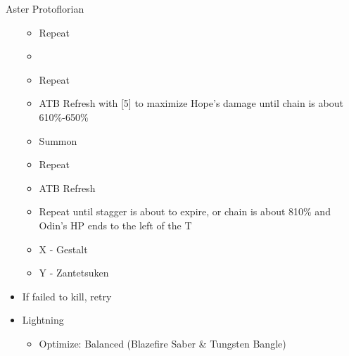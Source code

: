 \begin{paracol}{2}
\begin{battle}{Aster Protoflorian}
\begin{itemize}
			      \begin{itemize}
				      \item Repeat
				      \item \stagger
				      \item Repeat
				      \item ATB Refresh with [5] to maximize Hope's damage until chain is about 610\%-650\%
				      \item Summon
				      \item Repeat
				      \item ATB Refresh
				      \item Repeat until stagger is about to expire, or chain is about 810\% and Odin's HP ends to the left of the T
				      \item X - Gestalt
				      \item Y - Zantetsuken
			      \end{itemize}
			\item If failed to kill, retry
		\end{itemize}
	\end{battle}
	\switchcolumn*

	\begin{menu}
		\begin{itemize}
			\equip
			\begin{itemize}
				\item Lightning
				      \begin{itemize}
					      \item Optimize: Balanced (Blazefire Saber \& Tungsten Bangle)
				      \end{itemize}
			\end{itemize}
		\end{itemize}
	\end{menu}
	\switchcolumn
	\switchcolumn*

	\switchcolumn



\end{paracol}
